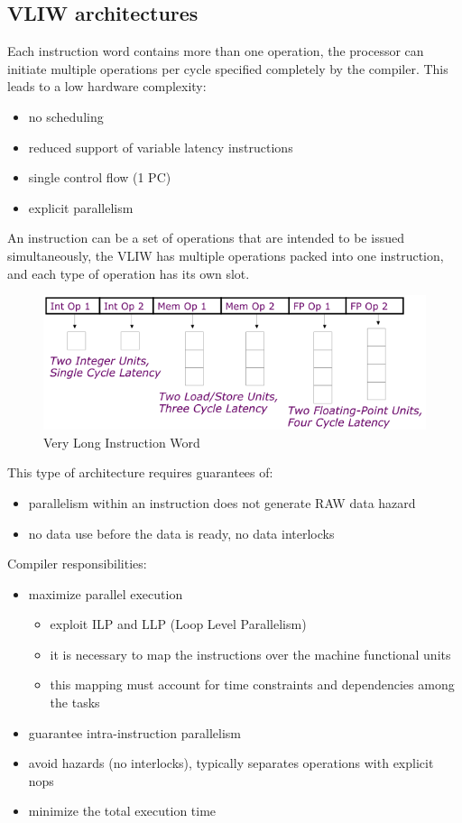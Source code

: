 \subsection{VLIW architectures}\label{subsec:vliw-architectures}
Each instruction word contains more than one operation, the processor can initiate multiple operations per cycle
specified completely by the compiler.
This leads to a low hardware complexity:
\begin{itemize}[noitemsep]
    \item no scheduling
    \item reduced support of variable latency instructions
    \item single control flow (1 PC)
    \item explicit parallelism
\end{itemize}

An instruction can be a set of operations that are intended to be issued simultaneously, the VLIW has multiple
operations packed into one instruction, and each type of operation has its own slot.

\begin{figure}[h]
    \centering
    \includegraphics[scale = 0.4]{images/vliw}
    \caption{Very Long Instruction Word}
    \label{fig:vliw}
\end{figure}

This type of architecture requires guarantees of:
\begin{itemize}
    \item parallelism within an instruction does not generate RAW data hazard
    \item no data use before the data is ready, no data interlocks
\end{itemize}

Compiler responsibilities:
\begin{itemize}
    \item maximize parallel execution
    \begin{itemize}
        \item exploit ILP and LLP (Loop Level Parallelism)
        \item it is necessary to map the instructions over the machine functional units
        \item this mapping must account for time constraints and dependencies among the tasks
    \end{itemize}
    \item guarantee intra-instruction parallelism
    \item avoid hazards (no interlocks), typically separates operations with explicit nops
    \item minimize the total execution time
\end{itemize}


